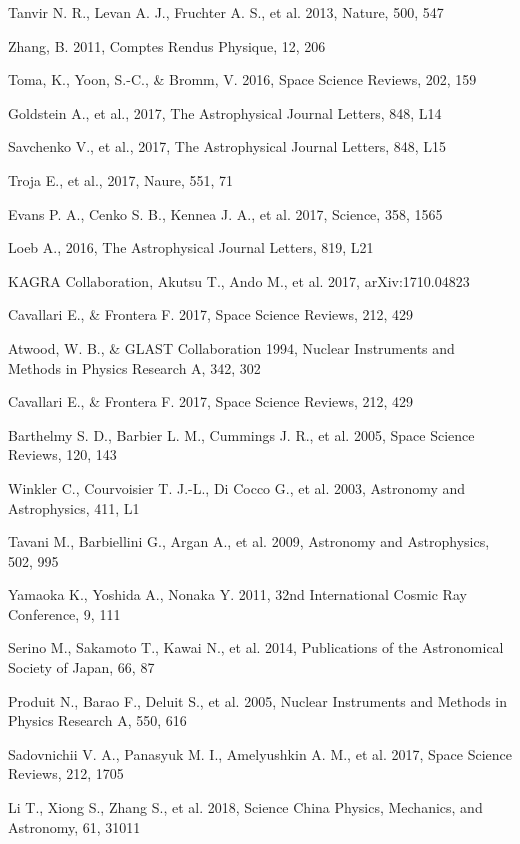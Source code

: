\documentclass[12pt, a4paper,titlepage]{article}
\numberwithin{equation}{section}
\numberwithin{figure}{section}
\begin{document}
\begin{thebibliography}{99}
 Tanvir N. R., Levan A. J., Fruchter A. S., et al. 2013, Nature, 500, 547

 Zhang, B. 2011, Comptes Rendus Physique, 12, 206

 Toma, K., Yoon, S.-C., \& Bromm, V. 2016, Space Science Reviews, 202, 159

 Goldstein A., et al., 2017, The Astrophysical Journal Letters, 848, L14

 Savchenko V., et al., 2017, The Astrophysical Journal Letters, 848, L15

 Troja E., et al., 2017, Naure, 551, 71

 Evans P. A., Cenko S. B., Kennea J. A., et al. 2017, Science, 358, 1565

 Loeb A., 2016, The Astrophysical Journal Letters, 819, L21

 KAGRA Collaboration, Akutsu T., Ando M., et al. 2017, arXiv:1710.04823

 Cavallari E., \& Frontera F. 2017, Space Science Reviews, 212, 429
 
 Atwood, W. B., \& GLAST Collaboration 1994, Nuclear Instruments and Methods in Physics Research
A, 342, 302

 Cavallari E., \& Frontera F. 2017, Space Science Reviews, 212, 429

 Barthelmy S. D., Barbier L. M., Cummings J. R., et al. 2005, Space Science Reviews, 120, 143

 Winkler C., Courvoisier T. J.-L., Di Cocco G., et al. 2003, Astronomy and Astrophysics, 411, L1

 Tavani M., Barbiellini G., Argan A., et al. 2009, Astronomy and Astrophysics, 502, 995

 Yamaoka K., Yoshida A., Nonaka Y. 2011, 32nd International Cosmic Ray Conference, 9, 111

 Serino M., Sakamoto T., Kawai N., et al. 2014, Publications of the Astronomical Society of Japan, 66,
87

 Produit N., Barao F., Deluit S., et al. 2005, Nuclear Instruments and Methods in Physics Research A,
550, 616

 Sadovnichii V. A., Panasyuk M. I., Amelyushkin A. M., et al. 2017, Space Science Reviews, 212, 1705

 Li T., Xiong S., Zhang S., et al. 2018, Science China Physics, Mechanics, and Astronomy, 61, 31011


\end{thebibliography}
\end{document}
